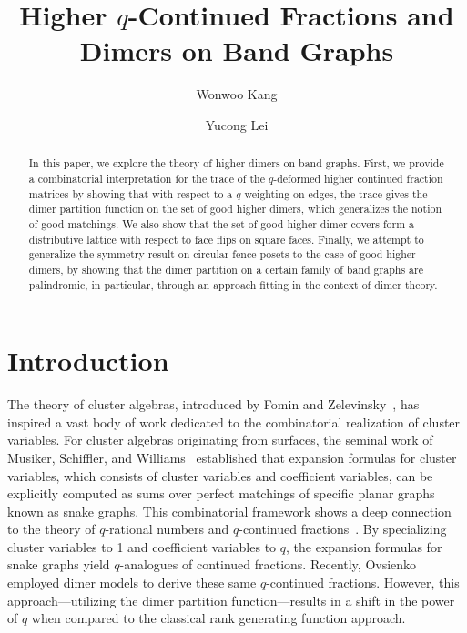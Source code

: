 \documentclass[11pt]{amsart}
\title{Higher $q$-Continued Fractions and Dimers on Band Graphs}
\author{Wonwoo Kang}
\author{Yucong Lei}
\theoremstyle{definition}
\theoremstyle{remark}
\numberwithin{equation}{section}
\begin{document}
\begin{abstract} 

In this paper, we explore the theory of higher dimers on band graphs. First, we provide a combinatorial interpretation for the trace of the $q$-deformed higher continued fraction matrices by showing that with respect to a $q$-weighting on edges, the trace gives the dimer partition function on the set of good higher dimers, which generalizes the notion of good matchings. We also show that the set of good higher dimer covers form a distributive lattice with respect to face flips on square faces. Finally, we attempt to generalize the symmetry result on circular fence posets to the case of good higher dimers, by showing that the dimer partition on a certain family of band graphs are palindromic, in particular, through an approach fitting in the context of dimer theory.
\end{abstract}
\maketitle

\tableofcontents

\section{Introduction}

The theory of cluster algebras, introduced by Fomin and Zelevinsky~\cite{FZ2002}, has inspired a vast body of work dedicated to the combinatorial realization of cluster variables. For cluster algebras originating from surfaces, the seminal work of Musiker, Schiffler, and Williams~\cite{musiker2011positivity} established that expansion formulas for cluster variables, which consists of cluster variables and coefficient variables, can be explicitly computed as sums over perfect matchings of specific planar graphs known as snake graphs. This combinatorial framework shows a deep connection to the theory of $q$-rational numbers and $q$-continued fractions~\cite{CS20, MGO20}. By specializing cluster variables to 1 and coefficient variables to $q$, the expansion formulas for snake graphs yield $q$-analogues of continued fractions. Recently, Ovsienko~\cite{ovsienko2025qrationalsdimers} employed dimer models to derive these same $q$-continued fractions. However, this approach—utilizing the dimer partition function—results in a shift in the power of $q$ when compared to the classical rank generating function approach.
\end{document}
